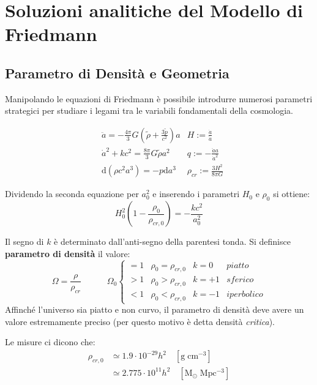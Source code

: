 \section{Soluzioni analitiche del Modello di Friedmann}
\subsection{Parametro di Densità e Geometria}
Manipolando le equazioni di Friedmann è possibile introdurre numerosi parametri strategici per studiare i legami tra le variabili fondamentali della cosmologia.

\begin{align*}
   & \ddot{a}  =-\frac{4\pi}{3}G\left ( \tilde{\rho}+\frac{3\tilde{p}}{c^2} \right )a &  H:=\frac{\dot{a}}{\dot{a}} \\
      & \dot{a}^2+kc^2  =\frac{8\pi}{3}G\tilde{\rho} a^2 & q:= - \frac{\ddot{a}a}{\dot{a}^2} \\
   & \mathrm{d}(\rho c^2 a^3)= - p \mathrm{d}a^3 & \rho_{cr}:=\frac{3H^2}{8 \pi G}
\end{align*}

Dividendo la seconda equazione per $a_0^2$ e inserendo i parametri $H_0$ e $\rho_0$ si ottiene:
\begin{equation}
    H_0^2 \left ( 1-\frac{\rho_0}{\rho_{cr,0}}  \right ) = -\frac{kc^2}{a_0^2} \label{eq:friedmannh0rho0}
\end{equation}

Il segno di $k$ è determinato dall'anti-segno della parentesi tonda. Si definisce \textbf{parametro di densità} il valore:
\begin{equation}
    \Omega=\frac{\rho}{\rho_{cr}}\qquad\quad \Omega_0 \left\{\begin{matrix}
=1 & \rho_0=\rho_{cr,0} & k=0 & piatto\\ 
>1 & \rho_0>\rho_{cr,0} & k=+1 & sferico\\ 
<1 & \rho_0<\rho_{cr,0} & k=-1 & iperbolico
\end{matrix}\right.
\end{equation}
Affinché l'universo sia piatto e non curvo, il parametro di densità deve avere un valore estremamente preciso (per questo motivo è detta densità \textit{critica}).

Le misure ci dicono che:
\begin{align}
    \rho_{cr,0} & \simeq 1.9\cdot 10^{-29}h^2\quad [\mathrm{g\;cm^{-3}}] \\
    & \simeq 2.775\cdot 10^{11}h^2\quad [\mathrm{M_\odot\;Mpc^{-3}}]
\end{align}

